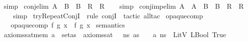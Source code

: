 \begin{isabellebody}
%
\isatagproof
{}\isamarkupfalse%
\ simp%
\endisatagproof
{\isafoldproof}%
%
\isadelimproof
\isanewline
%
\endisadelimproof
\isanewline
{}\isamarkupfalse%
\ conj{\isacharunderscore}{\kern0pt}elim{\isacharunderscore}{\kern0pt}{}{\isacharcolon}{\kern0pt}\ {\isachardoublequoteopen}A\ {\isasymand}\ B\ {\isasymLongrightarrow}\ {\isacharparenleft}{\kern0pt}B\ {\isasymLongrightarrow}\ R{\isacharparenright}{\kern0pt}\ {\isasymLongrightarrow}\ R{\isachardoublequoteclose}\isanewline
%
\isadelimproof
\ \ %
\endisadelimproof
%
\isatagproof
{}\isamarkupfalse%
\ simp%
\endisatagproof
{\isafoldproof}%
%
\isadelimproof
\isanewline
%
\endisadelimproof
\isanewline
{}\isamarkupfalse%
\ conj{\isacharunderscore}{\kern0pt}imp{\isacharunderscore}{\kern0pt}elim{\isacharcolon}{\kern0pt}\ {\isachardoublequoteopen}{\isacharparenleft}{\kern0pt}A\ {\isasymand}\ {\isacharparenleft}{\kern0pt}A\ {\isasymlongrightarrow}\ B{\isacharparenright}{\kern0pt}{\isacharparenright}{\kern0pt}\ {\isasymLongrightarrow}\ {\isacharparenleft}{\kern0pt}B\ {\isasymLongrightarrow}\ R{\isacharparenright}{\kern0pt}\ {\isasymLongrightarrow}\ R{\isachardoublequoteclose}\isanewline
%
\isadelimproof
\ \ %
\endisadelimproof
%
\isatagproof
{}\isamarkupfalse%
\ simp%
\endisatagproof
{\isafoldproof}%
%
\isadelimproof
\isanewline
%
\endisadelimproof
\isanewline
{}\isamarkupfalse%
\ tryRepeatConjI\ {\isacharequal}{\kern0pt}\ {\isacharparenleft}{\kern0pt}{\isacharparenleft}{\kern0pt}rule\ conjI{\isacharparenright}{\kern0pt}{\isacharplus}{\kern0pt}\ {\isacharbar}{\kern0pt}\ tactic\ {\isacartoucheopen}all{\isacharunderscore}{\kern0pt}tac{\isacartoucheclose}{\isacharparenright}{\kern0pt}\isanewline
\isanewline
\isanewline
{}\isamarkupfalse%
\ opaque{\isacharunderscore}{\kern0pt}comp\ \isanewline
\ \ \ {\isachardoublequoteopen}opaque{\isacharunderscore}{\kern0pt}comp\ f\ g\ x\ {\isacharequal}{\kern0pt}\ f\ {\isacharparenleft}{\kern0pt}g\ x{\isacharparenright}{\kern0pt}{\isachardoublequoteclose}\isanewline
\isanewline
\isanewline
{}\isamarkupfalse%
\ semantics\ \isanewline
\isanewline
{}\isamarkupfalse%
\ axioms{\isacharunderscore}{\kern0pt}sat{\isacharunderscore}{\kern0pt}mem{\isacharcolon}{\kern0pt}\ {\isachardoublequoteopen}a\ {\isasymin}\ set{\isacharparenleft}{\kern0pt}as{\isacharparenright}{\kern0pt}\ {\isasymLongrightarrow}\ axioms{\isacharunderscore}{\kern0pt}sat\ {\isasymLambda}\ {\isasymGamma}\ ns\ as\ {\isasymLongrightarrow}\ {\isasymLambda}{\isacharcomma}{\kern0pt}{\isasymGamma}{\isacharcomma}{\kern0pt}{\isacharbrackleft}{\kern0pt}{\isacharbrackright}{\kern0pt}\ {\isasymturnstile}\ {\isasymlangle}a{\isacharcomma}{\kern0pt}\ ns{\isasymrangle}\ {\isasymDown}\ LitV\ {\isacharparenleft}{\kern0pt}LBool\ {\isacharparenleft}{\kern0pt}True{\isacharparenright}{\kern0pt}{\isacharparenright}{\kern0pt}{\isachardoublequoteclose}\isanewline

\end{isabellebody}
